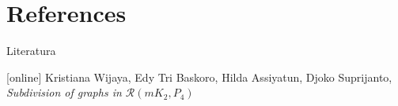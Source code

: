 \documentclass{beamer}
\begin{document}
\begin{frame}
\begin{figure}
	\centering
	\quad
\end{figure}
\end{frame}



\section{References}
\begin{frame}[allowframebreaks]{Literatura}
\begin{thebibliography}{}
	[online]
	Kristiana Wijaya, Edy Tri Baskoro, Hilda Assiyatun, Djoko Suprijanto, \textit{Subdivision of graphs in $\mathcal{R}(mK_2,P_4)$}
\end{thebibliography}
\end{frame}
\end{document}
